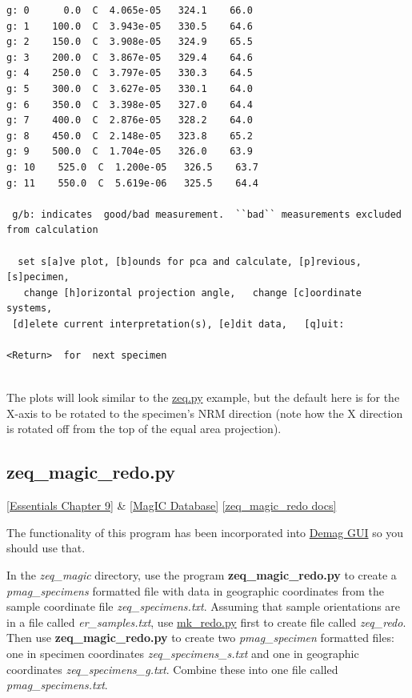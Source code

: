 \documentclass[11pt]{book}
\begin{document}
{{{\begin{verbatim}
g: 0      0.0  C  4.065e-05   324.1    66.0
g: 1    100.0  C  3.943e-05   330.5    64.6
g: 2    150.0  C  3.908e-05   324.9    65.5
g: 3    200.0  C  3.867e-05   329.4    64.6
g: 4    250.0  C  3.797e-05   330.3    64.5
g: 5    300.0  C  3.627e-05   330.1    64.0
g: 6    350.0  C  3.398e-05   327.0    64.4
g: 7    400.0  C  2.876e-05   328.2    64.0
g: 8    450.0  C  2.148e-05   323.8    65.2
g: 9    500.0  C  1.704e-05   326.0    63.9
g: 10    525.0  C  1.200e-05   326.5    63.7
g: 11    550.0  C  5.619e-06   325.5    64.4

 g/b: indicates  good/bad measurement.  ``bad`` measurements excluded from calculation

  set s[a]ve plot, [b]ounds for pca and calculate, [p]revious, [s]pecimen,
   change [h]orizontal projection angle,   change [c]oordinate systems,
 [d]elete current interpretation(s), [e]dit data,   [q]uit:

<Return>  for  next specimen


\end{verbatim}

The plots will look similar to the \href{#zeq.py}{zeq.py} example, but the default here is for the X-axis to be rotated to the specimen's NRM direction (note how the X direction is rotated off from the top of the equal area projection).




\subsection{zeq\_magic\_redo.py}
\href{http://earthref.org/MAGIC/books/Tauxe/Essentials/WebBook3ch9.html#ch9}{[Essentials Chapter 9]}  \& \href{#MagICDatabase}{[MagIC Database]}
\href{https://github.com/PmagPy/PmagPy/blob/master/programs/zeq_magic_redo.py}{[zeq\_magic\_redo docs]}

The functionality of this program has been incorporated into \href{#demag_gui.py}{Demag GUI} so you should use that.


In the {\it zeq\_magic} directory, use the program {\bf zeq\_magic\_redo.py} to create a {\it pmag\_specimens} formatted file with data in geographic coordinates from the sample coordinate file {\it zeq\_specimens.txt}.
Assuming that sample orientations are in a file called {\it er\_samples.txt}, use \href{#mk_redo.py}{mk\_redo.py} first to create file called {\it zeq\_redo}.  Then use
{\bf zeq\_magic\_redo.py} to create two {\it pmag\_specimen} formatted files:  one in specimen coordinates {\it zeq\_specimens\_s.txt} and one in geographic coordinates {\it zeq\_specimens\_g.txt}.   Combine these into one file called {\it pmag\_specimens.txt}.

}}}
\end{document}
